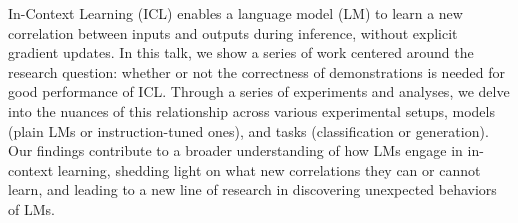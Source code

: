In-Context Learning (ICL) enables a language model (LM) to learn a new correlation between inputs and outputs during inference, without explicit gradient updates. In this talk, we show a series of work centered around the research question: whether or not the correctness of demonstrations is needed for good performance of ICL. Through a series of experiments and analyses, we delve into the nuances of this relationship across various experimental setups, models (plain LMs or instruction-tuned ones), and tasks (classification or generation). Our findings contribute to a broader understanding of how LMs engage in in-context learning, shedding light on what new correlations they can or cannot learn, and leading to a new line of research in discovering unexpected behaviors of LMs.